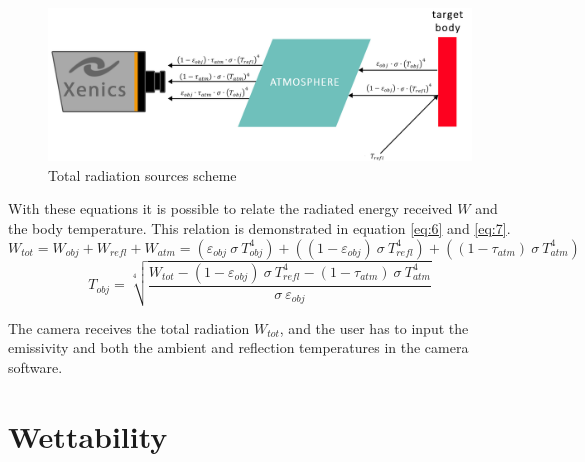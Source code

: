 \begin{figure}
\includegraphics[width=1\linewidth]{Figures/2.Chapter/ir_camera_radiation_scheme.png}
\caption{Total radiation sources scheme}
\label{fig:camscheme}
\end{figure}

\par With these equations it is possible to relate the radiated energy received $W$ and the body temperature. This relation is demonstrated in equation \ref{eq:6} and \ref{eq:7}.
\begin{equation}\label{eq:6}
W_{tot}=W_{obj}+W_{refl}+W_{atm}=(\varepsilon_{obj} \ \sigma \ T_{obj}^4)+((1-\varepsilon_{obj}) \ \sigma \ T_{refl}^4)+((1-\tau_{atm}) \ \sigma \ T_{atm}^4)
\end{equation}
\begin{equation}\label{eq:7}
T_{obj}=\sqrt[4]{\frac{W_{tot}-(1-\varepsilon_{obj}) \ \sigma \ T_{refl}^4-(1-\tau_{atm}) \ \sigma \ T_{atm}^4}{\sigma \ \varepsilon_{obj}}}
\end{equation}
\par The camera receives the total radiation $W_{tot}$, and the user has to input the emissivity and both the ambient and reflection temperatures in the camera software.

\section{Wettability}


